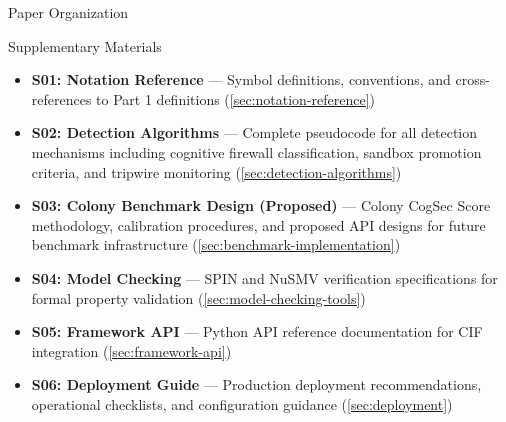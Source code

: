 \documentclass[
  ignorenonframetext,
]{beamer}
\providecommand{\tightlist}{%
  \setlength{\itemsep}{0pt}\setlength{\parskip}{0pt}}
\begin{document}
\begin{frame}{Paper Organization}
\begin{block}{Supplementary Materials}
\begin{itemize}
\tightlist
\item
  \textbf{S01: Notation Reference} --- Symbol definitions, conventions,
  and cross-references to Part 1 definitions
  (\cref{sec:notation-reference})
\item
  \textbf{S02: Detection Algorithms} --- Complete pseudocode for all
  detection mechanisms including cognitive firewall classification,
  sandbox promotion criteria, and tripwire monitoring
  (\cref{sec:detection-algorithms})
\item
  \textbf{S03: Colony Benchmark Design (Proposed)} --- Colony CogSec
  Score methodology, calibration procedures, and proposed API designs
  for future benchmark infrastructure
  (\cref{sec:benchmark-implementation})
\item
  \textbf{S04: Model Checking} --- SPIN and NuSMV verification
  specifications for formal property validation
  (\cref{sec:model-checking-tools})
\item
  \textbf{S05: Framework API} --- Python API reference documentation for
  CIF integration (\cref{sec:framework-api})
\item
  \textbf{S06: Deployment Guide} --- Production deployment
  recommendations, operational checklists, and configuration guidance
  (\cref{sec:deployment})
\end{itemize}
\end{block}
\end{frame}
\end{document}
